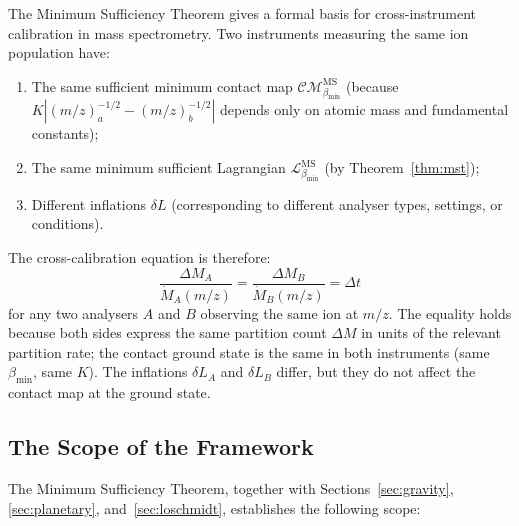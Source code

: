 \documentclass[12pt, a4paper]{article}
\theoremstyle{plain}
\theoremstyle{definition}
\theoremstyle{remark}
\newcommand{\bmin}{\beta_{\min}}
\newcommand{\Lmin}{\mathcal{L}_{\bmin}}
\newcommand{\CM}{\mathcal{CM}}
\begin{document}
The Minimum Sufficiency Theorem gives a formal basis for cross-instrument
calibration in mass spectrometry. Two instruments measuring the same ion
population have:
\begin{enumerate}[label=(\roman*)]
  \item The same sufficient minimum contact map $\CM_{\bmin}^{\mathrm{MS}}$
  (because $K|(m/z)_a^{-1/2} - (m/z)_b^{-1/2}|$ depends only on atomic
  mass and fundamental constants);
  \item The same minimum sufficient Lagrangian $\Lmin^{\mathrm{MS}}$ (by
  Theorem~\ref{thm:mst});
  \item Different inflations $\delta L$ (corresponding to different analyser
  types, settings, or conditions).
\end{enumerate}
The cross-calibration equation is therefore:
\[
  \frac{\Delta M_A}{\dot{M}_A(m/z)} = \frac{\Delta M_B}{\dot{M}_B(m/z)} = \Delta t
\]
for any two analysers $A$ and $B$ observing the same ion at $m/z$. The equality
holds because both sides express the same partition count $\Delta M$ in units
of the relevant partition rate; the contact ground state is the same in both
instruments (same $\bmin$, same $K$). The inflations $\delta L_A$ and $\delta
L_B$ differ, but they do not affect the contact map at the ground state.

\subsection{The Scope of the Framework}

The Minimum Sufficiency Theorem, together with Sections~\ref{sec:gravity},
\ref{sec:planetary}, and~\ref{sec:loschmidt}, establishes the following scope:
\end{document}
